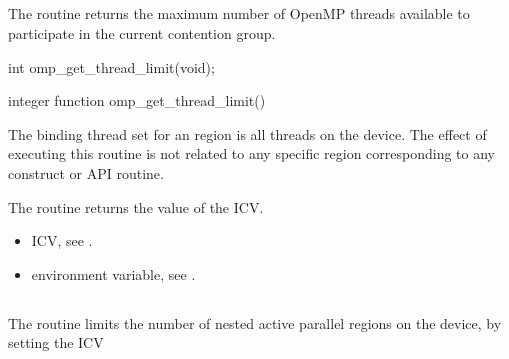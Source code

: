 \subsection{}
\label{subsec:omp_get_thread_limit}
\summary
The  routine returns the maximum number of OpenMP 
threads available to participate in the current contention group. 

\newpage %
\format
\begin{ccppspecific}
\begin{ompcFunction}
int omp_get_thread_limit(void);
\end{ompcFunction}
\end{ccppspecific}

\begin{fortranspecific}
\begin{ompfFunction}
integer function omp_get_thread_limit()
\end{ompfFunction}
\end{fortranspecific}

\binding
The binding thread set for an  region is all threads on the 
device. The effect of executing this routine is not related to any specific region 
corresponding to any construct or API routine. 

\effect
The  routine returns the value of the  ICV.

\crossreferences
\begin{itemize}
\item {} ICV, see 
.

\item {} environment variable, see 
.
\end{itemize}









\subsection{}
\label{subsec:omp_set_max_active_levels}
\summary
The  routine limits the number of nested active 
parallel regions on the device, by setting the  ICV

